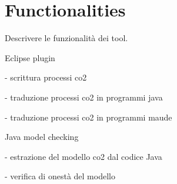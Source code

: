 \section{Functionalities}
Descrivere le funzionalità dei tool.

Eclipse plugin

- scrittura processi co2

- traduzione processi co2 in programmi java

- traduzione processi co2 in programmi maude



Java model checking

- estrazione del modello co2 dal codice Java

- verifica di onestà del modello 
